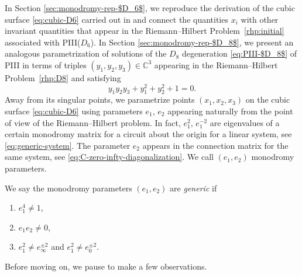 \documentclass[pdftex]{sigma}
\numberwithin{equation}{section}
\newcommand{\C}{{\mathbb{C}}}
\begin{document}
In Section \ref{sec:monodromy-rep-$D_6$}, we reproduce the derivation of the cubic surface \eqref{eq:cubic-D6} carried out in \cite{PS} and connect the quantities $x_i$ with other invariant quantities that appear in the Riemann--Hilbert Problem~\ref{rhp:initial} associated with PIII($D_6$). In Section \ref{sec:monodromy-rep-$D_8$}, we present an analogous parametrization of solutions of the $D_8$ degeneration \eqref{eq:PIII-$D_8$} of PIII in terms of triples $(y_1, y_2, y_3) \in \C^3$ appearing in the Riemann--Hilbert Problem~\ref{rhp:D8} and satisfying
\begin{equation}
\label{eq:cubic-D8}
y_1 y_2 y_3 + y_1^2 + y_2^2 + 1 = 0.
\end{equation}
Away from its singular points, we parametrize points $(x_1,x_2,x_3)$ on the cubic surface \eqref{eq:cubic-D6} using parameters $e_1$, $e_2$ appearing naturally from the point of view of the Riemann--Hilbert problem. In fact, $e_1^2$, $e_1^{-2}$ are eigenvalues of a certain monodromy matrix for a circuit about the origin for a linear system, see \eqref{eq:generic-system}. The parameter $e_2$ appears in the connection matrix for the same system, see \eqref{eq:C-zero-infty-diagonalization}.
We call $(e_1,e_2)$ monodromy parameters.
\begin{Definition}\label{def:generic}\samepage
We say the monodromy parameters $(e_1, e_2)$ are \emph{generic} if
 \begin{enumerate}\itemsep=0pt
 \item[(i)] $e_1^4 \neq 1$,
 \item[(ii)] $e_1 e_2 \neq 0$,
 \item[(iii)] $e_1^2 \neq e_\infty^{\pm 2}$ and $e_1^2 \neq e_0^{\pm 2}$.
 \end{enumerate}
\end{Definition}
Before moving on, we pause to make a few observations.
\end{document}

